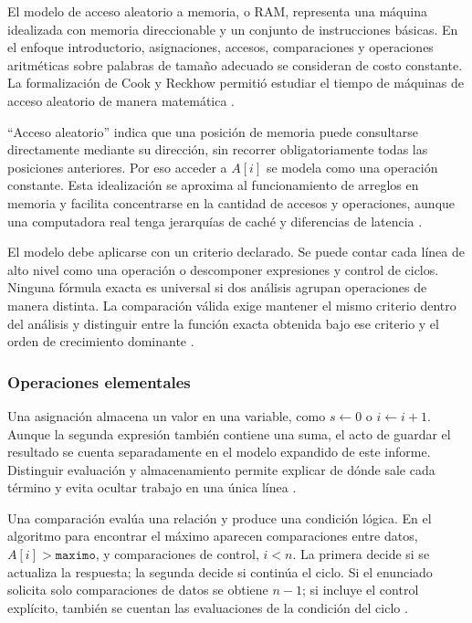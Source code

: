 \documentclass[12pt,letterpaper]{article}
\newcommand{\codigo}[1]{\texttt{#1}}
\begin{document}
El modelo de acceso aleatorio a memoria, o RAM, representa una máquina idealizada con memoria direccionable y un conjunto de instrucciones básicas. En el enfoque introductorio, asignaciones, accesos, comparaciones y operaciones aritméticas sobre palabras de tamaño adecuado se consideran de costo constante. La formalización de Cook y Reckhow permitió estudiar el tiempo de máquinas de acceso aleatorio de manera matemática \citep{cook1973,zanabria2026,cormen2022}.

``Acceso aleatorio'' indica que una posición de memoria puede consultarse directamente mediante su dirección, sin recorrer obligatoriamente todas las posiciones anteriores. Por eso acceder a $A[i]$ se modela como una operación constante. Esta idealización se aproxima al funcionamiento de arreglos en memoria y facilita concentrarse en la cantidad de accesos y operaciones, aunque una computadora real tenga jerarquías de caché y diferencias de latencia \citep{cook1973,knuth1997,cormen2022}.

El modelo debe aplicarse con un criterio declarado. Se puede contar cada línea de alto nivel como una operación o descomponer expresiones y control de ciclos. Ninguna fórmula exacta es universal si dos análisis agrupan operaciones de manera distinta. La comparación válida exige mantener el mismo criterio dentro del análisis y distinguir entre la función exacta obtenida bajo ese criterio y el orden de crecimiento dominante \citep{cormen2022,sedgewick2011,skiena2020}.

\subsubsection{Operaciones elementales}

Una asignación almacena un valor en una variable, como $s\leftarrow 0$ o $i\leftarrow i+1$. Aunque la segunda expresión también contiene una suma, el acto de guardar el resultado se cuenta separadamente en el modelo expandido de este informe. Distinguir evaluación y almacenamiento permite explicar de dónde sale cada término y evita ocultar trabajo en una única línea \citep{zanabria2026,cormen2022,knuth1997}.

Una comparación evalúa una relación y produce una condición lógica. En el algoritmo para encontrar el máximo aparecen comparaciones entre datos, $A[i]>\codigo{maximo}$, y comparaciones de control, $i<n$. La primera decide si se actualiza la respuesta; la segunda decide si continúa el ciclo. Si el enunciado solicita solo comparaciones de datos se obtiene $n-1$; si incluye el control explícito, también se cuentan las evaluaciones de la condición del ciclo \citep{cormen2022,sedgewick2011,goodrichcpp2011}.
\end{document}
